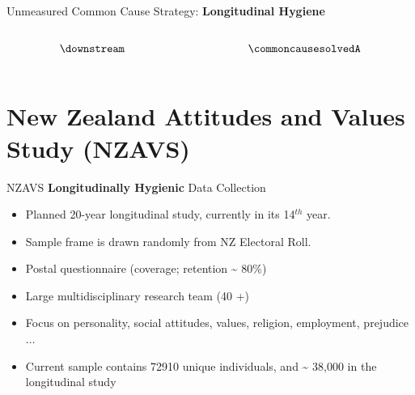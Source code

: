 \documentclass[
  ignorenonframetext,
  aspectratio=169,
]{beamer}
\begin{document}
\begin{frame}{Unmeasured Common Cause Strategy: \textbf{Longitudinal
Hygiene}}
\label{unmeasured-common-cause-strategy-longitudinal-hygiene}
\begin{columns}[T]
\begin{column}{0.5\textwidth}
\[\downstream\]
\end{column}

\begin{column}{0.5\textwidth}
\[\commoncausesolvedA\]
\end{column}
\end{columns}
\end{frame}

\section{New Zealand Attitudes and Values Study
(NZAVS)}\label{new-zealand-attitudes-and-values-study-nzavs}

\begin{frame}{NZAVS \textbf{Longitudinally Hygienic} Data Collection}
\label{nzavs-longitudinally-hygienic-data-collection}
\begin{itemize}
\item
  Planned 20-year longitudinal study, currently in its 14\(^{th}\) year.
\item
  Sample frame is drawn randomly from NZ Electoral Roll.
\item
  Postal questionnaire (coverage; retention \textasciitilde{} 80\%)
\item
  Large multidisciplinary research team (40 +)
\item
  Focus on personality, social attitudes, values, religion, employment,
  prejudice \(\dots\)
\item
  Current sample contains 72910 unique individuals, and
  \textasciitilde{} 38,000 in the longitudinal study
\end{itemize}
\end{frame}
\end{document}
